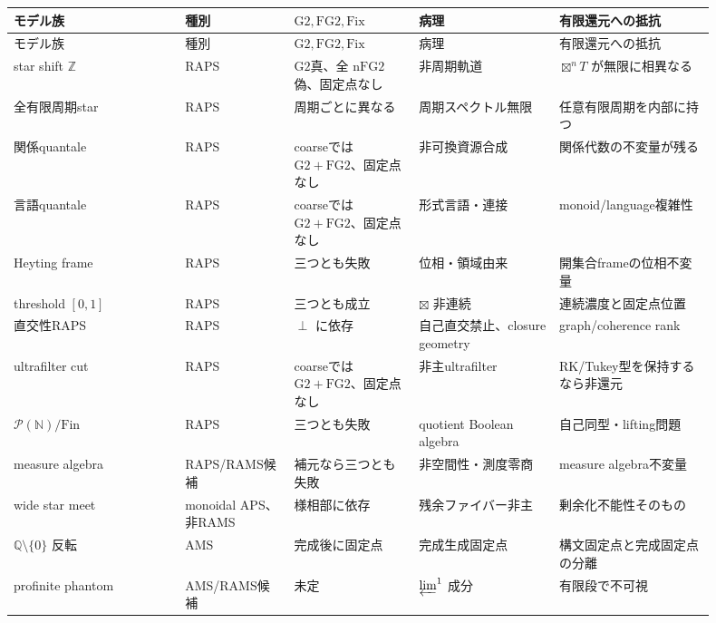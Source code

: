 \documentclass[uplatex,dvipdfmx,a4paper,10pt]{jsarticle}
\newcommand{\Gtwo}{\mathrm{G2}}
\newcommand{\FGtwo}{\mathrm{FG2}}
\newcommand{\nFGtwo}{\mathrm{nFG2}}
\newcommand{\Fix}{\mathrm{Fix}}
\newcommand{\bt}{\boxtimes}
\newcommand{\Pow}{\mathcal P}
\newcommand{\N}{\mathbb N}
\newcommand{\Q}{\mathbb Q}
\newcommand{\Z}{\mathbb Z}
\begin{document}
\begin{longtable}{>{\raggedright\arraybackslash}p{0.22\linewidth}
                  >{\raggedright\arraybackslash}p{0.14\linewidth}
                  >{\raggedright\arraybackslash}p{0.16\linewidth}
                  >{\raggedright\arraybackslash}p{0.18\linewidth}
                  >{\raggedright\arraybackslash}p{0.20\linewidth}}
\toprule
モデル族 & 種別 & \(\Gtwo,\FGtwo,\Fix\) & 病理 & 有限還元への抵抗 \\
\midrule
\endfirsthead
\toprule
モデル族 & 種別 & \(\Gtwo,\FGtwo,\Fix\) & 病理 & 有限還元への抵抗 \\
\midrule
\endhead
star shift \(\Z\) &
RAPS &
\(\Gtwo\)真、全 \(\nFGtwo\) 偽、固定点なし &
非周期軌道 &
\(\bt^nT\) が無限に相異なる \\
\midrule
全有限周期star &
RAPS &
周期ごとに異なる &
周期スペクトル無限 &
任意有限周期を内部に持つ \\
\midrule
関係quantale &
RAPS &
coarseでは \(\Gtwo+\FGtwo\)、固定点なし &
非可換資源合成 &
関係代数の不変量が残る \\
\midrule
言語quantale &
RAPS &
coarseでは \(\Gtwo+\FGtwo\)、固定点なし &
形式言語・連接 &
monoid/language複雑性 \\
\midrule
Heyting frame &
RAPS &
三つとも失敗 &
位相・領域由来 &
開集合frameの位相不変量 \\
\midrule
threshold \([0,1]\) &
RAPS &
三つとも成立 &
\(\bt\) 非連続 &
連続濃度と固定点位置 \\
\midrule
直交性RAPS &
RAPS &
\(\perp\) に依存 &
自己直交禁止、closure geometry &
graph/coherence rank \\
\midrule
ultrafilter cut &
RAPS &
coarseでは \(\Gtwo+\FGtwo\)、固定点なし &
非主ultrafilter &
RK/Tukey型を保持するなら非還元 \\
\midrule
\(\Pow(\N)/\mathrm{Fin}\) &
RAPS &
三つとも失敗 &
quotient Boolean algebra &
自己同型・lifting問題 \\
\midrule
measure algebra &
RAPS/RAMS候補 &
補元なら三つとも失敗 &
非空間性・測度零商 &
measure algebra不変量 \\
\midrule
wide star meet &
monoidal APS、非RAMS &
様相部に依存 &
残余ファイバー非主 &
剰余化不能性そのもの \\
\midrule
\(\Q\setminus\{0\}\) 反転 &
AMS &
完成後に固定点 &
完成生成固定点 &
構文固定点と完成固定点の分離 \\
\midrule
profinite phantom &
AMS/RAMS候補 &
未定 &
\(\varprojlim^1\) 成分 &
有限段で不可視 \\
\bottomrule
\end{longtable}
\end{document}
